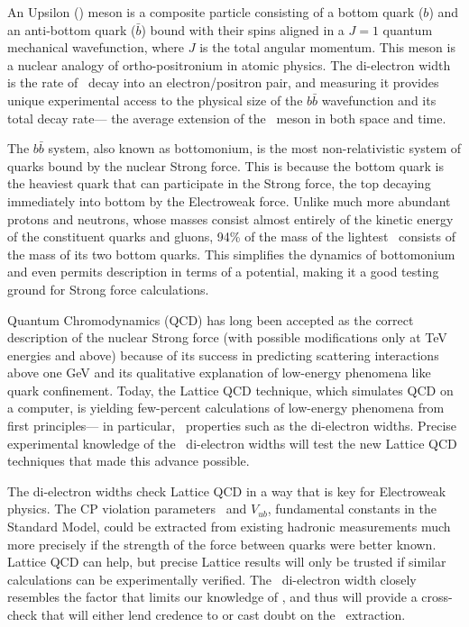 \documentclass{cornell}
\begin{document}
An Upsilon (\ups) meson is a composite particle consisting of a bottom quark
($b$) and an anti-bottom quark ($\bar{b}$) bound with their spins
aligned in a $J=1$ quantum mechanical wavefunction, where $J$ is the
total angular momentum.  This meson is a nuclear analogy of
ortho-positronium in atomic physics.  The di-electron width is the
rate of \ups\ decay into an electron/positron pair, and measuring it
provides unique experimental access to the physical size of the
$b\bar{b}$ wavefunction and its total decay rate--- the average
extension of the \ups\ meson in both space and time.

The $b\bar{b}$ system, also known as bottomonium, is the most
non-relativistic system of quarks bound by the nuclear Strong force.
This is because the bottom quark is the heaviest quark that can
participate in the Strong force, the top decaying immediately into
bottom by the Electroweak force.  Unlike much more abundant protons
and neutrons, whose masses consist almost entirely of the kinetic
energy of the constituent quarks and gluons, 94\% of the mass of the
lightest \ups\ consists of the mass of its two bottom quarks.  This
simplifies the dynamics of bottomonium and even permits description in
terms of a potential, making it a good testing ground for Strong force
calculations.

Quantum Chromodynamics (QCD) has long been accepted as the correct
description of the nuclear Strong force (with possible modifications
only at TeV energies and above) because of its success in predicting
scattering interactions above one GeV and its qualitative explanation
of low-energy phenomena like quark confinement.  Today, the Lattice
QCD technique, which simulates QCD on a computer, is yielding
few-percent calculations of low-energy phenomena from first
principles--- in particular, \ups\ properties such as the di-electron
widths.  Precise experimental knowledge of the \ups\ di-electron
widths will test the new Lattice QCD techniques that made this advance
possible.

The di-electron widths check Lattice QCD in a way that is key for
Electroweak physics.  The CP violation parameters \vtd\ and $V_{ub}$,
fundamental constants in the Standard Model, could be extracted from
existing hadronic measurements much more precisely if the strength of
the force between quarks were better known.  Lattice QCD can help, but
precise Lattice results will only be trusted if similar calculations
can be experimentally verified.  The \ups\ di-electron width closely
resembles the factor that limits our knowledge of \vtd, and thus will
provide a cross-check that will either lend credence to or cast doubt
on the \vtd\ extraction.
\end{document}
